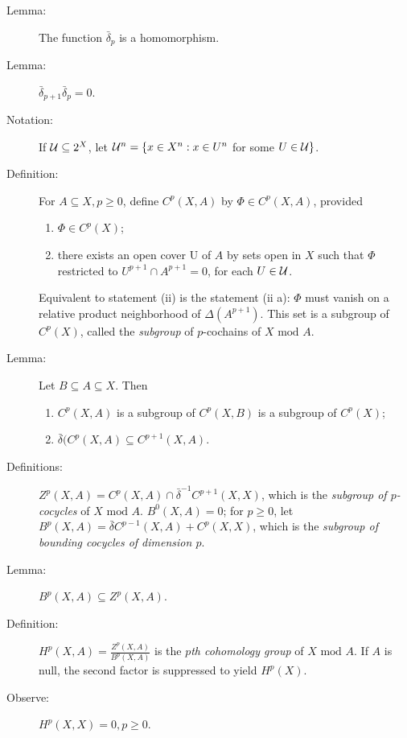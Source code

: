 \documentclass{article}
\begin{document}
\begin{description}

\item[Lemma:] The function $\bar{\delta}_p$ is a homomorphism.

\item[Lemma:] $\bar{\delta}_{p+1} \bar{\delta}_p = 0$.

\item[Notation:] If ${\cal U} \subseteq 2^X$, let ${\cal U}^n= \{ x \in X^n : x \in U^n$ for some $U \in {\cal U} \}$.

\item[Definition:] For $A \subseteq X, p \geq 0$, define $C^p(X,A)$ by $\Phi \in C^p(X,A)$, provided 
  \begin{enumerate}[\hspace{1cm}(i)]
    \item $\Phi \in C^p(X)$; 
    \item there exists an open cover {\cal U} of $A$ by sets open in $X$ such that $\Phi$ restricted to $U^{p+1} \cap A^{p+1}=0$, for each $U \in {\cal U}$. 
  \end{enumerate}
  Equivalent to statement (ii) is the statement (ii a): $\Phi$ must vanish on a relative product neighborhood of $\Delta (A^{p+1})$. This set is a subgroup of $C^p(X)$, called the \emph{subgroup} of $p$-cochains of $X \text{ mod } A$.

\item[Lemma:] Let $B \subseteq A \subseteq X$. Then
  \begin{enumerate}[\hspace{1cm}(a)]
    \item $C^p(X,A)$ is a subgroup of $C^p(X,B)$ is a subgroup of $C^p(X)$;
    \item $\bar{\delta} (C^p(X,A) \subseteq C^{p+1}(X,A)$.
  \end{enumerate}

\item[Definitions:] $Z^p(X,A) = C^p(X,A) \cap \bar{\delta}^{-1}C^{p+1}(X,X)$, which is the \emph{subgroup of $p$-cocycles} of $X \text{ mod } A$. $B^0(X,A)=0$; for $p \geq 0$, let $B^p(X,A) = \bar{\delta} C^{p-1}(X,A)+C^p(X,X)$, which is the \emph{subgroup of bounding cocycles of dimension $p$}.

\item[Lemma:] $B^p(X,A) \subseteq Z^p(X,A)$.

\item[Definition:] $H^p(X,A) = \frac{Z^p(X,A)}{B^p(X,A)}$ is the \emph{$p$th cohomology group} of $X \text{ mod } A$. If $A$ is null, the second factor is suppressed to yield $H^p(X)$.

\item[Observe:] $H^p(X,X) = 0,p \geq 0$.

\end{description}
\end{document}
